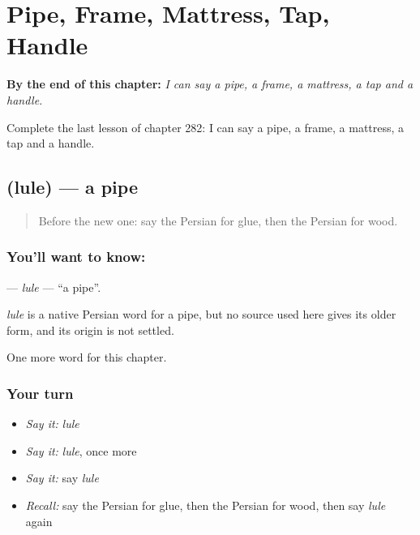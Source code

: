 
\chapter{Pipe, Frame, Mattress, Tap, Handle}
\label{ch:fa-pipe-frame-mattress-tap-handle}

\begin{chapteropening}
\textbf{By the end of this chapter:} \emph{I can say a pipe, a frame, a mattress, a tap and a handle.}

Complete the last lesson of chapter 282: I can say a pipe, a frame, a mattress, a tap and a handle.
\end{chapteropening}

\section[\texorpdfstring{\fa{لوله} (lule)}{لوله (lule)}]{ (lule) — a pipe}

\label{lesson:FA-C282-lule}



\begin{quote}
Before the new one: say the Persian for glue, then the Persian for wood.
\end{quote}

\subsection*{You'll want to know: }
\textbf{} — \emph{lule} — \textquotedblleft{}a pipe\textquotedblright{}.

\begin{cousinweb}
\emph{lule} is a native Persian word for a pipe, but no source used here gives its older form, and its origin is not settled.
\end{cousinweb}

\begin{grammarlens}[title={What you've built}]
One more word for this chapter.
\end{grammarlens}

\subsection*{Your turn}
\begin{itemize}
\raggedright
  \item \emph{Say it:} \emph{lule}
  \item \emph{Say it:} \emph{lule}, once more
  \item \emph{Say it:} say \emph{lule}
  \item \emph{Recall:} say the Persian for glue, then the Persian for wood, then say \emph{lule} again
\end{itemize}

